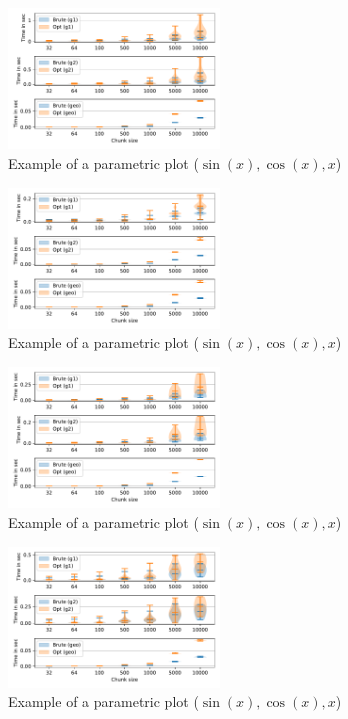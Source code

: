 \begin{figure}[h]
\centering
\includegraphics[width=0.5\textwidth]{data/raw/eclass_514en.pdf}
\caption{Example of a parametric plot ($\sin (x), \cos(x), x$)}
\end{figure}

\begin{figure}[h]
\centering
\includegraphics[width=0.5\textwidth]{data/raw/geospecies.pdf}
\caption{Example of a parametric plot ($\sin (x), \cos(x), x$)}
\end{figure}

\begin{figure}[h]
\centering
\includegraphics[width=0.5\textwidth]{data/raw/enzyme.pdf}
\caption{Example of a parametric plot ($\sin (x), \cos(x), x$)}
\end{figure}

\begin{figure}[h]
\centering
\includegraphics[width=0.5\textwidth]{data/raw/gohierarchy.pdf}
\caption{Example of a parametric plot ($\sin (x), \cos(x), x$)}
\end{figure}


